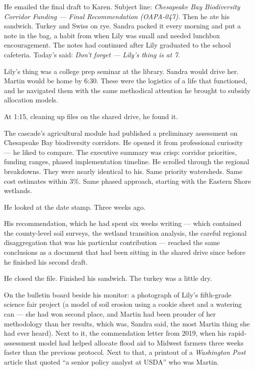 \documentclass[11pt]{article}
\begin{document}
He emailed the final draft to Karen. Subject line: \emph{Chesapeake Bay Biodiversity Corridor Funding --- Final Recommendation (OAPA-047).} Then he ate his sandwich. Turkey and Swiss on rye. Sandra packed it every morning and put a note in the bag, a habit from when Lily was small and needed lunchbox encouragement. The notes had continued after Lily graduated to the school cafeteria. Today's said: \emph{Don't forget --- Lily's thing is at 7.}

Lily's thing was a college prep seminar at the library. Sandra would drive her. Martin would be home by 6:30. These were the logistics of a life that functioned, and he navigated them with the same methodical attention he brought to subsidy allocation models.

At 1:15, cleaning up files on the shared drive, he found it.

The cascade's agricultural module had published a preliminary assessment on Chesapeake Bay biodiversity corridors. He opened it from professional curiosity --- he liked to compare. The executive summary was crisp: corridor priorities, funding ranges, phased implementation timeline. He scrolled through the regional breakdowns. They were nearly identical to his. Same priority watersheds. Same cost estimates within 3\%. Same phased approach, starting with the Eastern Shore wetlands.

He looked at the date stamp. Three weeks ago.

His recommendation, which he had spent six weeks writing --- which contained the county-level soil surveys, the wetland transition analysis, the careful regional disaggregation that was his particular contribution --- reached the same conclusions as a document that had been sitting in the shared drive since before he finished his second draft.

He closed the file. Finished his sandwich. The turkey was a little dry.

On the bulletin board beside his monitor: a photograph of Lily's fifth-grade science fair project (a model of soil erosion using a cookie sheet and a watering can --- she had won second place, and Martin had been prouder of her methodology than her results, which was, Sandra said, the most Martin thing she had ever heard). Next to it, the commendation letter from 2019, when his rapid-assessment model had helped allocate flood aid to Midwest farmers three weeks faster than the previous protocol. Next to that, a printout of a \emph{Washington Post} article that quoted ``a senior policy analyst at USDA'' who was Martin.
\end{document}
